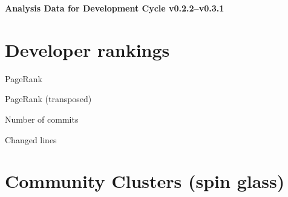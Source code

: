\documentclass{article}
\begin{document}
\setlength{\parindent}{0pt}
\begin{center}
\begin{Large}
\textbf{Analysis Data for Development Cycle v0.2.2--v0.3.1}
\end{Large}
\end{center}
\section{Developer rankings}
\begin{small}\renewcommand{\tabcolsep}{1pt}
\begin{minipage}{0.5\linewidth}
PageRank\\

\end{minipage}%
\begin{minipage}{0.5\linewidth}
PageRank (transposed)\\

\end{minipage}

\renewcommand{\tabcolsep}{5pt}
\begin{minipage}{0.5\linewidth}
Number of commits\\

\end{minipage}%
\begin{minipage}{0.5\linewidth}
Changed lines\\

\end{minipage}
\end{small}
\newpage\section{Community Clusters (spin glass)}
\end{document}
